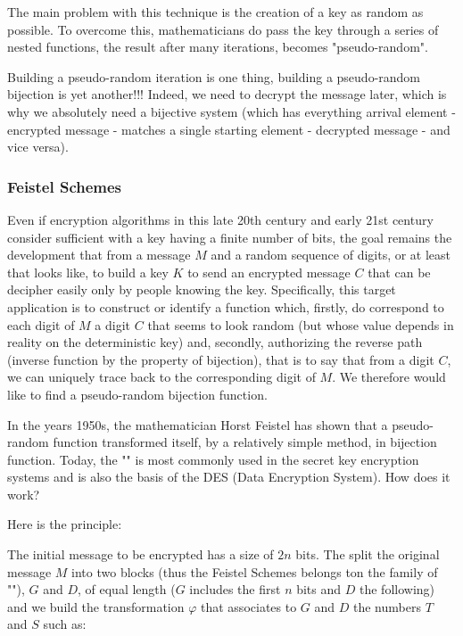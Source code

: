 	The main problem with this technique is the creation of a key as random as possible. To overcome this, mathematicians do pass the key through a series of nested functions, the result after many iterations, becomes "pseudo-random".
	
	Building a pseudo-random iteration is one thing, building a pseudo-random bijection is yet another!!! Indeed, we need to decrypt the message later, which is why we absolutely need a bijective system (which has everything arrival element - encrypted message - matches a single starting element - decrypted message - and vice versa).
	
	\subsubsection{Feistel Schemes}
	Even if encryption algorithms in this late 20th century and early 21st century consider sufficient with a key having a finite number of bits, the goal remains the development that from a message $M$ and a random sequence of digits, or at least that looks like, to build a key $K$ to send an encrypted message $C$ that can be decipher easily only by people knowing the key. Specifically, this target application is to construct or identify a function which, firstly, do correspond to each digit of $M$ a digit $C$ that seems to look random (but whose value depends in reality on the deterministic key) and, secondly, authorizing the reverse path (inverse function by the property of bijection), that is to say that from a digit $C$, we can uniquely trace back to the corresponding digit of $M$. We therefore would like to find a pseudo-random bijection function.
	
	In the years 1950s, the mathematician Horst Feistel has shown that a pseudo-random function transformed itself, by a relatively simple method, in bijection function. Today, the "" is most commonly used in the secret key encryption systems and is also the basis of the DES (Data Encryption System). How does it work?
	
	Here is the principle:
	
	The initial message to be encrypted has a size of $2n$ bits. The split the original message $M$ into two blocks (thus the Feistel Schemes belongs ton the family of ""), $G$ and $D$, of equal length ($G$ includes the first $n$ bits and $D$ the following) and we build the transformation $\varphi$ that associates to $G$ and $D$ the numbers $T$ and $S$ such as:
	
